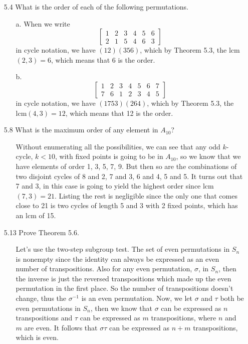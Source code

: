 \documentclass[12pt]{article}
\begin{document}
\begin{enumerate}
\item[5.4] What is the order of each of the following permutations. 
\begin{enumerate}
\item[a.] When we write 
\[
\left[ 
\begin{array}{cccccc} 
1 & 2 & 3 & 4 & 5 & 6 \\
2 & 1 & 5 & 4 & 6 & 3 
\end{array} 
\right]
\]
in cycle notation, we have $(12)(356)$, which by Theorem 5.3, 
the lcm$(2, 3) = 6$, which means that 6 is the order.
\item[b.] 
\[
\left[ 
\begin{array}{ccccccc} 
1 & 2 & 3 & 4 & 5 & 6 & 7 \\
7 & 6 & 1 & 2 & 3 & 4 & 5
\end{array} 
\right]
\]
in cycle notation, we have $(1753)(264)$, which by Theorem 5.3, 
the lcm$(4, 3) = 12$, which means that 12 is the order.
\end{enumerate}

\item[5.8] What is the maximum order of any element in $A_{10}$?
\begin{enumerate}
\item[] Without enumerating all the possibilities, we can see that any odd $k$-cycle, $k < 10$, 
with fixed points is going to be in $A_{10}$, so we know that we have elements of order 1, 3, 
5, 7, 9. But then so are the combinations of two disjoint cycles of 8 and 2, 7 and 3, 6 and 4, 5 
and 5. It turns out that 7 and 3, in this case is going to yield the highest order since 
lcm$(7, 3) = 21$. Listing the rest is negligible since the only one that comes close to 21 is
two cycles of length 5 and 3 with 2 fixed points, which has an lcm of 15.
\end{enumerate}

\item[5.13] Prove Theorem 5.6.
\begin{enumerate}
\item[] Let's use the two-step subgroup test. The set of even permutations in $S_n$ is nonempty
since the identity can always be expressed as an even number of transpositions. Also for any even
permutation, $\sigma$, in $S_n$, then the inverse is just the reversed transpositions which made up the 
even permutation in the first place. So the number of transpositions doesn't change, thus
the $\sigma^{-1}$ is an even permutation. Now, we let $\sigma$ and $\tau$ both be even
permutations in $S_n$, then we know that $\sigma$ can be expressed as $n$ transpositions
and $\tau$ can be expressed as $m$ transpositions, where $n$ and $m$ are even. It follows 
that $\sigma\tau$ can be expressed as $n + m$ transpositions, which is even.
\end{enumerate}


\end{enumerate}
\end{document}
